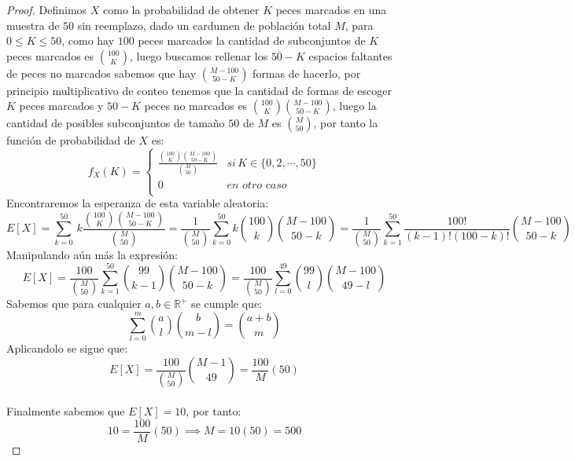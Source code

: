 \documentclass[11pt]{article}
\newcommand{\R}{\mathbb{R}}
\begin{document}
\begin{proof}
    Definimos $X$ como la probabilidad de obtener $K$ peces marcados en una muestra de $50$ sin reemplazo, dado un cardumen de poblaci\'on total $M$, para $0\leq K\leq 50$, como hay $100$ peces marcados
    la cantidad de subconjuntos de $K$ peces marcados es $\binom{100}{K}$, luego buscamos rellenar los $50-K$ espacios faltantes de peces no marcados sabemos que hay $\binom{M-100}{50-K}$ formas de hacerlo, por principio
    multiplicativo de conteo tenemos que la cantidad de formas de escoger $K$ peces marcados y $50-K$ peces no marcados es $\binom{100}{K}\binom{M-100}{50-K}$, luego la cantidad de posibles subconjuntos de tamaño $50$ de $M$ es $\binom{M}{50}$, por tanto la función de probabilidad de $X$ es:\,\\
 \[
f_{X}(K) =
\begin{cases}
\frac{\binom{100}{K}\binom{M-100}{50-K}}{\binom{M}{50}} & si\,K\in \{0,2,\cdots,50\}\\
0 & en\,\,otro\,\,caso \\
\end{cases}\]
Encontraremos la esperanza de esta variable aleatoria:\,\\
\begin{equation*}
    E[X]=\sum_{k=0}^{50}\,k\frac{\binom{100}{K}\binom{M-100}{50-K}}{\binom{M}{50}}=\frac{1}{\binom{M}{50}}\sum_{k=0}^{50}k\binom{100}{k}\binom{M-100}{50-k}=\frac{1}{\binom{M}{50}}\sum_{k=1}^{50}\frac{100!}{(k-1)!(100-k)!}\binom{M-100}{50-k}
\end{equation*}
Manipulando a\'un m\'as la expresi\'on:\,\\
\begin{equation*}
    E[X]=\frac{100}{\binom{M}{50}}\sum_{k=1}^{50}\binom{99}{k-1}\binom{M-100}{50-k}=\frac{100}{\binom{M}{50}}\sum_{l=0}^{49}\binom{99}{l}\binom{M-100}{49-l}
\end{equation*}
Sabemos que para cualquier $a,b\in \R^{+}$ se cumple que:\,\\
\begin{equation*}
    \sum_{l=0}^{m}\binom{a}{l}\binom{b}{m-l}=\binom{a+b}{m}
\end{equation*}
Aplicandolo se sigue que:\,\\
\begin{equation*}
      E[X]=\frac{100}{\binom{M}{50}}\binom{M-1}{49}=\frac{100}{M}(50)
\end{equation*}\,\\
Finalmente sabemos que $E[X]=10$, por tanto:\,\\
\begin{equation*}
    10=\frac{100}{M}(50)\implies M=10(50)=500
\end{equation*}
\end{proof}
\end{document}
